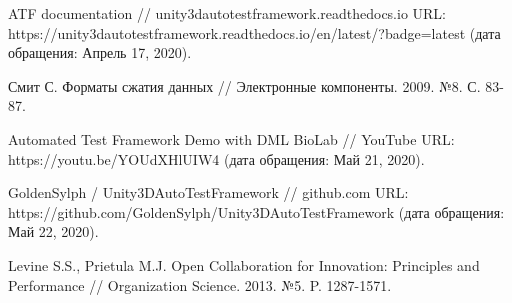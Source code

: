 \begin{thebibliography}{9}
	 ATF documentation // unity3dautotestframework.readthedocs.io URL: https://unity3dautotestframework.readthedocs.io/en/latest/?badge=latest (дата обращения: Апрель 17, 2020).
	
	 Смит С. Форматы сжатия данных // Электронные компоненты. 2009. №8. С. 83-87.
	
	 Automated Test Framework Demo with DML BioLab // YouTube URL: https://youtu.be/YOUdXHlUIW4 (дата обращения: Май 21, 2020).
	
	 GoldenSylph / Unity3DAutoTestFramework // github.com URL: https://github.com/GoldenSylph/Unity3DAutoTestFramework (дата обращения: Май 22, 2020).
	
	 Levine S.S., Prietula M.J. Open Collaboration for Innovation: Principles and Performance // Organization Science. 2013. №5. P. 1287-1571.
	
\end{thebibliography}